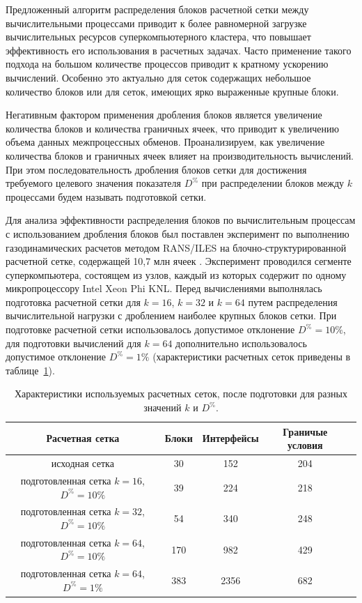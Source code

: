 Предложенный алгоритм распределения блоков расчетной сетки между вычислительными процессами приводит к более равномерной загрузке вычислительных ресурсов суперкомпьютерного кластера, что повышает эффективность его использования в расчетных задачах.
Часто применение такого подхода на большом количестве процессов приводит к кратному ускорению вычислений.
Особенно это актуально для сеток содержащих небольшое количество блоков или для сеток, имеющих ярко выраженные крупные блоки.

Негативным фактором применения дробления блоков является увеличение количества блоков и количества граничных ячеек, что приводит к увеличению объема данных межпроцессных обменов.
Проанализируем, как увеличение количества блоков и граничных ячеек влияет на производительность вычислений.
При этом последовательность дробления блоков сетки для достижения требуемого целевого значения показателя $D^{\%}$ при распределении блоков между $k$ процессами будем называть подготовкой сетки.

Для анализа эффективности распределения блоков по вычислительным процессам с использованием дробления блоков был поставлен эксперимент по выполнению газодинамических расчетов методом RANS/ILES\label{abbr:rans-2}\label{abbr:iles-2} на блочно-структурированной расчетной сетке, содержащей 10,7 млн ячеек \cite{Savin2019RANS}.
Эксперимент проводился сегменте суперкомпьютера, состоящем из узлов, каждый из которых содержит по одному микропроцессору Intel Xeon Phi KNL\label{abbr:knl-1}.
Перед вычислениями выполнялась подготовка расчетной сетки для $k = 16$, $k = 32$ и $k = 64$ путем распределения вычислительной нагрузки с дроблением наиболее крупных блоков сетки.
При подготовке расчетной сетки использовалось допустимое отклонение $D^{\%} = 10\%$, для подготовки вычислений для $k = 64$ дополнительно использовалось допустимое отклонение $D^{\%} = 1\%$ (характеристики расчетных сеток приведены в таблице~\ref{tbl:text_2_withcut}).

\begin{table}[!ht]
\centering
\singlespacing
{}\caption{Характеристики используемых расчетных сеток, после подготовки для разных значений $k$ и $D^{\%}$.}
\bigskip
\label{tbl:text_2_withcut}
\begin{tabular}{ | c | c | c | c | c | }
  \hline
  Расчетная сетка & Блоки & Интерфейсы & Граничые условия \\ \hline\hline
  исходная сетка & 30 & 152 & 204 \\ \hline\hline
  \makecell{подготовленная сетка \\ $k = 16$, $D^{\%} = 10\%$} & 39 & 224 & 218 \\ \hline
  \makecell{подготовленная сетка \\ $k = 32$, $D^{\%} = 10\%$} & 54 & 340 & 248 \\ \hline
  \makecell{подготовленная сетка \\ $k = 64$, $D^{\%} = 10\%$} & 170 & 982 & 429 \\ \hline\hline
  \makecell{подготовленная сетка \\ $k = 64$, $D^{\%} = 1\%$} & 383 & 2356 & 682 \\ \hline
\end{tabular}
\end{table}

